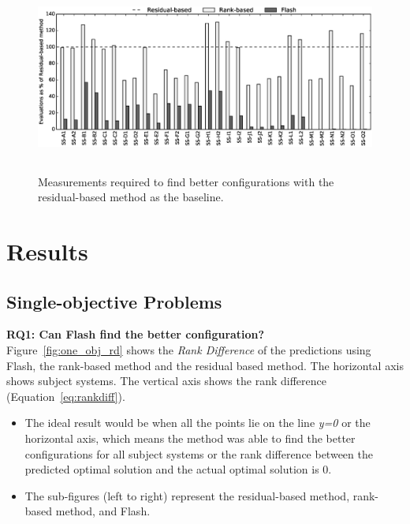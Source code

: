 \documentclass[10pt,journal,compsoc]{IEEEtran}
\newcommand{\flash}{{\sc Flash}\xspace}
\begin{document}
\begin{figure}[t]
        \centering
        \includegraphics[width=0.7\paperwidth, height=6.3cm]{Figures/one_obj_evals.eps}

        \caption{
        \small{
        Measurements required to find better configurations with the residual-based method as the baseline.\vspace{5mm}}
        }\label{fig:evals}
\end{figure}

\section{Results}
\subsection{Single-objective Problems}\label{sec:so_results}
\noindent\textbf{RQ1: Can  \flash find the better configuration?}\\
Figure~\ref{fig:one_obj_rd} shows the \textit{Rank Difference} of the predictions using \flash, the rank-based method and the residual based method. 
The horizontal axis shows subject systems. The vertical axis shows the rank difference (Equation~\ref{eq:rankdiff}).
\begin{itemize}[leftmargin=*]
    \item 
    The ideal result would be when all the points lie on the line \textit{y=0} or the horizontal axis, which means the method was able to find the better configurations for all subject systems or the rank difference between the predicted optimal solution and the actual optimal solution is 0. 
    \item The sub-figures (left to right) represent the residual-based method, rank-based method, and \flash.
\end{itemize}
\end{document}
